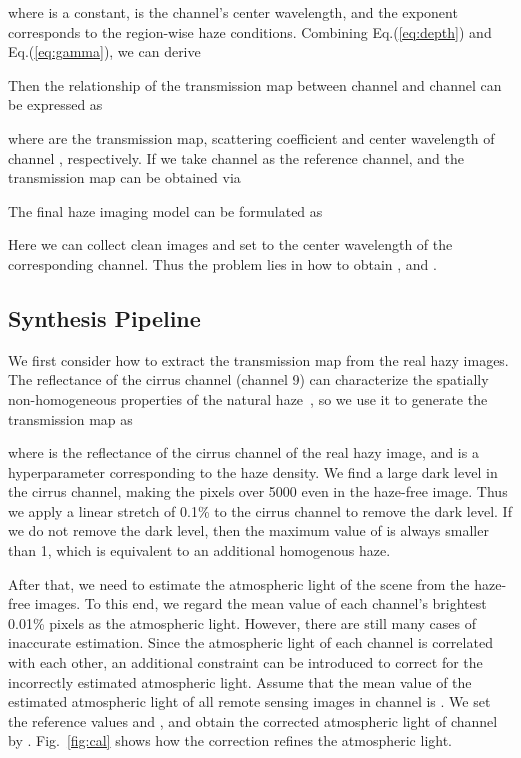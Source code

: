 \documentclass[journal]{IEEEtran}
\begin{document}
where  is a constant,  is the channel's center wavelength, and the exponent  corresponds to the region-wise haze conditions.
Combining Eq.(\ref{eq:depth}) and Eq.(\ref{eq:gamma}), we can derive

Then the relationship of the transmission map between channel  and channel  can be expressed as

where  are the transmission map, scattering coefficient and center wavelength of channel , respectively. 
If we take channel  as the reference channel, and the transmission map  can be obtained via

The final haze imaging model can be formulated as

Here we can collect clean images  and set  to the center wavelength of the corresponding channel. 
Thus the problem lies in how to obtain ,  and .

\subsection{Synthesis Pipeline}

We first consider how to extract the transmission map  from the real hazy images.
The reflectance of the cirrus channel (channel 9) can characterize the spatially non-homogeneous properties of the natural haze~\cite{guo2020rsdehazenet}, so we use it to generate the transmission map  as

where  is the reflectance of the cirrus channel of the real hazy image, and  is a hyperparameter corresponding to the haze density.
We find a large dark level in the cirrus channel, making the pixels over 5000 even in the haze-free image. 
Thus we apply a linear stretch of 0.1\% to the cirrus channel to remove the dark level.
If we do not remove the dark level, then the maximum value of  is always smaller than 1, which is equivalent to an additional homogenous haze.

After that, we need to estimate the atmospheric light of the scene from the haze-free images.
To this end, we regard the mean value of each channel's brightest 0.01\% pixels as the atmospheric light\cite{guo2020rsdehazenet}.
However, there are still many cases of inaccurate estimation. 
Since the atmospheric light of each channel is correlated with each other, an additional constraint can be introduced to correct for the incorrectly estimated atmospheric light.
Assume that the mean value of the estimated atmospheric light of all remote sensing images in channel  is .
We set the reference values  and , and obtain the corrected atmospheric light of channel  by .
Fig.~\ref{fig:cal} shows how the correction refines the atmospheric light.
\end{document}
